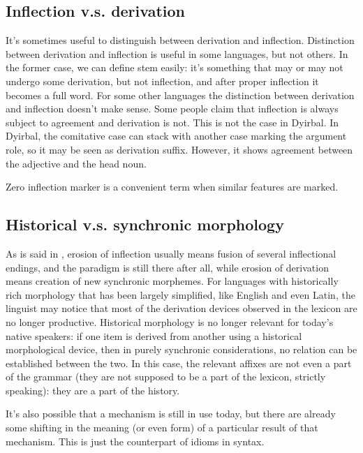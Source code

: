 \documentclass[UTF8, a4paper, oneside, scheme=plain]{ctexart}
\begin{document}
\subsection{Inflection v.s. derivation}

It's sometimes useful to distinguish between derivation and inflection. 
Distinction between derivation and inflection is useful in some languages, but not others. 
In the former case, we can define stem easily: it's something that may or may not undergo some derivation, 
but not inflection, and after proper inflection it becomes a full word. 
For some other languages the distinction between derivation and inflection doesn't make sense. 
Some people claim that inflection is always subject to agreement and derivation is not. 
This is not the case in Dyirbal. 
In Dyirbal, the comitative case can stack with another case marking the argument role, 
so it may be seen as derivation suffix. 
However, it shows agreement between the adjective and the head noun.

Zero inflection marker is a convenient term when similar features are marked.

\subsection{Historical v.s. synchronic morphology}\label{sec:history-or-current-morphology}

As is said in ,
erosion of inflection usually means fusion of several inflectional endings,
and the paradigm is still there after all,
while erosion of derivation means creation of new synchronic morphemes.
For languages with historically rich morphology
that has been largely simplified, 
like English and even Latin, 
the linguist may notice that most of the derivation devices observed in the lexicon 
are no longer productive.
Historical morphology is no longer relevant for today's native speakers:
if one item is derived from another using a historical morphological device,
then in purely synchronic considerations,
no relation can be established between the two.
In this case, the relevant affixes are not even a part of the grammar 
(they are not supposed to be a part of the lexicon, strictly speaking):
they are a part of the history.

It's also possible that a mechanism is still in use today,
but there are already some shifting in the meaning (or even form) 
of a particular result of that mechanism.
This is just the counterpart of idioms in syntax.
\end{document}
